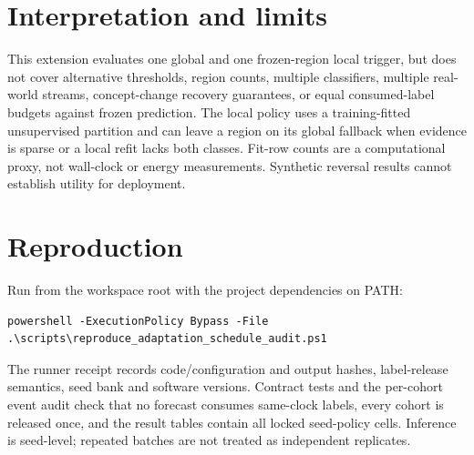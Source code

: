 \documentclass[10pt]{article}
\begin{document}
\FloatBarrier
\section{Interpretation and limits}
This extension evaluates one global and one frozen-region local trigger, but does not cover alternative thresholds, region counts, multiple classifiers, multiple real-world streams, concept-change recovery guarantees, or equal consumed-label budgets against frozen prediction. The local policy uses a training-fitted unsupervised partition and can leave a region on its global fallback when evidence is sparse or a local refit lacks both classes. Fit-row counts are a computational proxy, not wall-clock or energy measurements. Synthetic reversal results cannot establish utility for deployment.

\section{Reproduction}
Run from the workspace root with the project dependencies on PATH:
\begin{verbatim}
powershell -ExecutionPolicy Bypass -File .\scripts\reproduce_adaptation_schedule_audit.ps1
\end{verbatim}
The runner receipt records code/configuration and output hashes, label-release semantics, seed bank and software versions. Contract tests and the per-cohort event audit check that no forecast consumes same-clock labels, every cohort is released once, and the result tables contain all locked seed-policy cells. Inference is seed-level; repeated batches are not treated as independent replicates.
\end{document}
